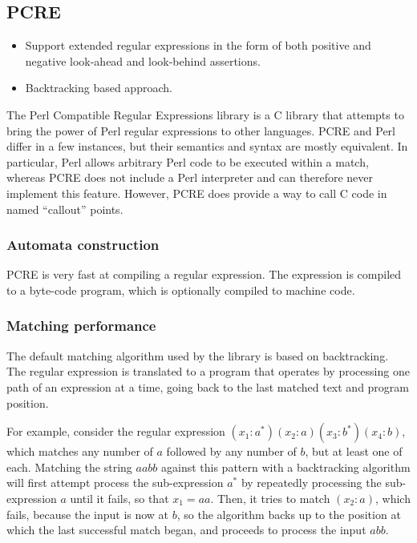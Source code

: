 \subsection{PCRE}

\begin{itemize}

   \item Support extended regular expressions in the form of both positive and
      negative look-ahead and look-behind assertions.

   \item Backtracking based approach.

\end{itemize}


The Perl Compatible Regular Expressions library is a C library that attempts to
bring the power of Perl regular expressions to other languages. PCRE and Perl
differ in a few instances, but their semantics and syntax are mostly equivalent.
In particular, Perl allows arbitrary Perl code to be executed within a match,
whereas PCRE does not include a Perl interpreter and can therefore never
implement this feature. However, PCRE does provide a way to call C code in named
``callout'' points.

\subsubsection{Automata construction}

PCRE is very fast at compiling a regular expression. The expression is compiled
to a byte-code program, which is optionally compiled to machine code.


\subsubsection{Matching performance}

The default matching algorithm used by the library is based on backtracking. The
regular expression is translated to a program that operates by processing one
path of an expression at a time, going back to the last matched text and program
position.

For example, consider the regular expression $(x_1:a^*)(x_2:a)(x_3:b^*)(x_4:b)$,
which matches any number of $a$ followed by any number of $b$, but at least one
of each. Matching the string $aabb$ against this pattern with a backtracking
algorithm will first attempt process the sub-expression $a^*$ by repeatedly
processing the sub-expression $a$ until it fails, so that $x_1 = aa$. Then, it
tries to match $(x_2:a)$, which fails, because the input is now at $b$, so the
algorithm backs up to the position at which the last successful match began, and
proceeds to process the input $abb$.

